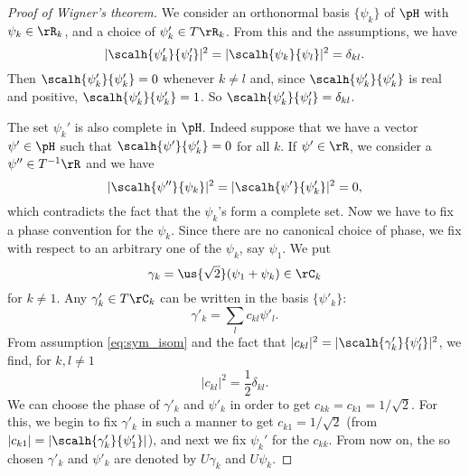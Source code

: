 \begin{proof}[Proof of Wigner's theorem]
	We consider an orthonormal basis $\{\psi_k\}$ of $\pH$ with $\psi_k\in\rR_k$, and a choice of $\psi'_k\in T\rR_k$. From this and the assumptions, we have
	\[
		|\scalh{\psi'_k}{\psi'_l}|^2=|\scalh{\psi_k}{\psi_l}|^2=\delta_{kl}.
	\]
	Then $\scalh{\psi'_k}{\psi'_k}=0$ whenever $k\neq l$ and, since $\scalh{\psi'_k}{\psi'_k}$ is real and positive, $\scalh{\psi'_k}{\psi'_k}=1$. So $\scalh{\psi'_k}{\psi'_l}=\delta_{kl}$.

	The set $\psi_k'$ is also complete in $\pH$. Indeed suppose that we have a vector $\psi'\in\pH$ such that $\scalh{\psi'}{\psi'_k}=0$ for all $k$. If $\psi'\in\rR$, we consider a $\psi''\in T^{-1}\rR$ and we have
	\[
		|\scalh{\psi''}{\psi_k}|^2=|\scalh{\psi'}{\psi'_k}|^2=0,
	\]
	which contradicts the fact that the $\psi_k$'s form a complete set. Now we have to fix a phase convention for the $\psi_k$. Since there are no canonical choice of phase, we fix with respect to an arbitrary one of the $\psi_k$, say $\psi_1$. We put
	\begin{equation}
		\gamma_k=\us{\sqrt{2}}(\psi_1+\psi_k)\in\rC_k
	\end{equation}
	for $k\neq 1$. Any $\gamma'_k\in T\rC_k$ can be written in the basis $\{\psi'_k\}$:
	\begin{equation}\label{eq:gamma_psi_k}
		\gamma'_k=\sum_l c_{kl}\psi'_l.
	\end{equation}
	From assumption \eqref{eq:sym_isom} and the fact that $|c_{kl}|^2=|\scalh{\gamma'_k}{\psi'_l}|^2$, we find, for $k,l\neq 1$
	\[
		|c_{kl}|^2=\frac{1}{2}\delta_{kl}.
	\]
	We can choose the phase of $\gamma'_k$ and $\psi'_k$ in order to get $c_{kk}=c_{k1}=1/\sqrt{2}$. For this, we begin to fix $\gamma'_k$ in such a manner to get $c_{k1}=1/\sqrt{2}$ (from $|c_{k1}|=|\scalh{\gamma'_k}{\psi'_1}|$), and next we fix $\psi_k'$ for the $c_{kk}$. From now on, the so chosen $\gamma'_k$ and $\psi'_k$ are denoted by $U\gamma_k$ and $U\psi_k$.


\end{proof}
